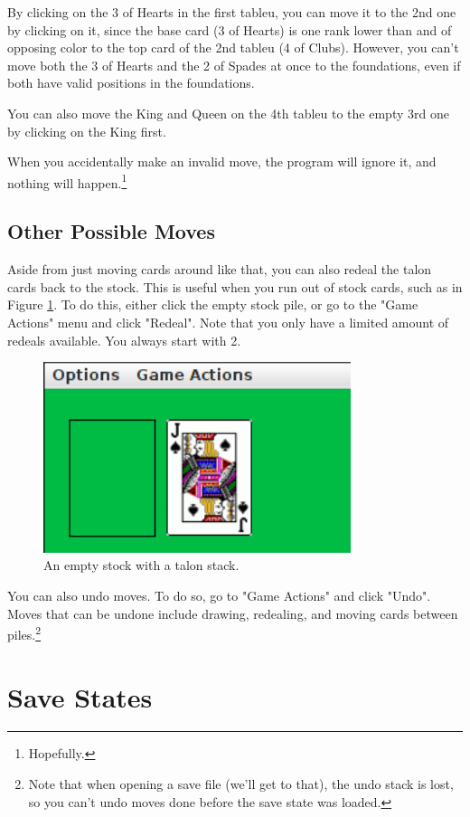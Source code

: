 \documentclass[12pt,a4paper,titlepage]{article}
\begin{document}
	By clicking on the 3 of Hearts in the first
	tableu, you can move it to the 2nd one by clicking on it, since the base
	card (3 of Hearts) is one rank lower than and of opposing color to the top
	card of the 2nd tableu (4 of Clubs). However, you can't move both the 3 of
	Hearts and the 2 of Spades at once to the foundations, even if both have
	valid positions in the foundations.

	You can also move the King and Queen on the 4th tableu to the empty 3rd one
	by clicking on the King first.

	When you accidentally make an invalid move, the program will ignore it, and
	nothing will happen.\footnote{Hopefully.}

	\subsection{Other Possible Moves}
	Aside from just moving cards around like that, you can also redeal the talon
	cards back to the stock. This is useful when you run out of stock cards,
	such as in Figure \ref{fig:fig4}. To do this, either click the empty stock
	pile, or go to the "Game Actions" menu and click "Redeal". Note that you
	only have a limited amount of redeals available. You always start with 2.

	\begin{figure}[H]
		\centering
		\captionsetup{justification=centering}
		\includegraphics[width=9cm]{images/fig4.png}
		\caption{An empty stock with a talon stack.}
		\label{fig:fig4}
	\end{figure}

	You can also undo moves. To do so, go to "Game Actions" and click "Undo".
	Moves that can be undone include drawing, redealing, and moving cards
	between piles.\footnote{Note that when opening a save file (we'll get to
	that), the undo stack is lost, so you can't undo moves done before the save
	state was loaded.}

	\newpage
	\section{Save States}
\end{document}
